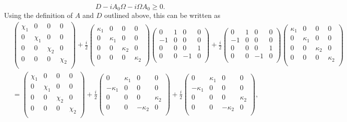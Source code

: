 \documentclass[11pt,a4paper]{article}
\numberwithin{equation}{section}
\begin{document}
	\begin{equation*}
		D - iA_0 \Omega - i\Omega A_0 \geq 0.
	\end{equation*}
		Using the definition of $A$ and $D$ outlined above, this can be written as 
	\begin{align*}
	&\begin{pmatrix}
	\chi_1 & 0 & 0 & 0\\
	0 & \chi_1 & 0 & 0\\
	0 & 0 & \chi_2 & 0 \\
	0 & 0 & 0 & \chi_2\\
	\end{pmatrix} + \frac{i}{2}\begin{pmatrix}
	\kappa_1 & 0 & 0 & 0\\
	0 & \kappa_1 & 0 & 0\\
	0 & 0 & \kappa_2 & 0 \\
	0 & 0 & 0 & \kappa_2\\
	\end{pmatrix}\begin{pmatrix}
	0 & 1 & 0 & 0 \\
	-1 & 0 & 0 & 0\\
	0 & 0 & 0 & 1\\
	0 & 0 & -1 & 0\\
	\end{pmatrix} + \frac{i}{2}\begin{pmatrix}
	0 & 1 & 0 & 0 \\
	-1 & 0 & 0 & 0\\
	0 & 0 & 0 & 1\\
	0 & 0 & -1 & 0\\
	\end{pmatrix}\begin{pmatrix}
	\kappa_1 & 0 & 0 & 0\\
	0 & \kappa_1 & 0 & 0\\
	0 & 0 & \kappa_2 & 0 \\
	0 & 0 & 0 & \kappa_2\\
	\end{pmatrix}&\\
	&= \begin{pmatrix}
	\chi_1 & 0 & 0 & 0\\
	0 & \chi_1 & 0 & 0\\
	0 & 0 & \chi_2 & 0 \\
	0 & 0 & 0 & \chi_2\\
	\end{pmatrix} + \frac{i}{2}\begin{pmatrix}
	0 & \kappa_1 & 0 & 0 \\
	-\kappa_1 & 0 & 0 & 0\\
	0 & 0 & 0 & \kappa_2\\
	0 & 0 & -\kappa_2 & 0\\
	\end{pmatrix}  + \frac{i}{2}\begin{pmatrix}
	0 & \kappa_1 & 0 & 0 \\
	-\kappa_1 & 0 & 0 & 0\\
	0 & 0 & 0 & \kappa_2\\
	0 & 0 & -\kappa_2 & 0\\
	\end{pmatrix},&\\
	\end{align*}
\end{document}
